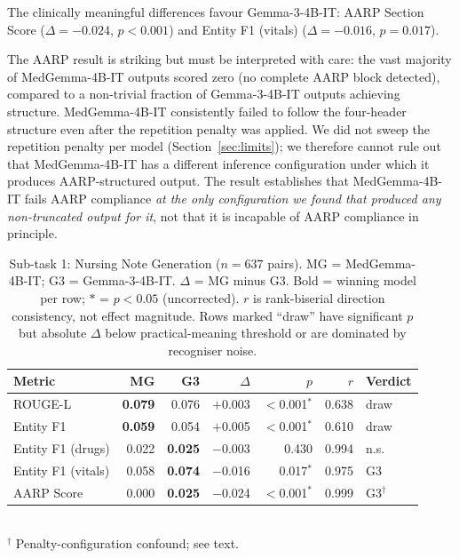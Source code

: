 \documentclass[sigconf,anonymous=false,review=false]{acmart}
\newcommand{\medgemma}{MedGemma-4B-IT\xspace}
\newcommand{\gemma}{Gemma-3-4B-IT\xspace}
\newcommand{\pval}[1]{$p{=}{#1}$}
\newcommand{\sig}{$p{<}0.001$}
\begin{document}
The clinically meaningful differences favour \gemma: AARP Section Score
($\Delta = -0.024$, \sig) and Entity F1 (vitals)
($\Delta = -0.016$, \pval{0.017}).

The AARP result is striking but must be interpreted with care: the vast
majority of \medgemma outputs scored zero (no complete AARP block detected),
compared to a non-trivial fraction of \gemma outputs achieving structure.
\medgemma consistently failed to follow the four-header structure even after
the repetition penalty was applied. We did not sweep the repetition penalty
per model (Section~\ref{sec:limits}); we therefore cannot rule out that
\medgemma has a different inference configuration under which it produces
AARP-structured output. The result establishes that \medgemma fails AARP
compliance \emph{at the only configuration we found that produced any
non-truncated output for it}, not that it is incapable of AARP compliance
in principle.

\begin{table}[t]
\caption{Sub-task 1: Nursing Note Generation ($n = 637$ pairs). MG = MedGemma-4B-IT; G3 = Gemma-3-4B-IT. $\Delta$ = MG minus G3. Bold = winning model per row; $*$ = $p < 0.05$ (uncorrected). $r$ is rank-biserial direction consistency, not effect magnitude. Rows marked ``draw'' have significant $p$ but absolute $\Delta$ below practical-meaning threshold or are dominated by recogniser noise.}
\label{tab:notes}
\small
\begin{tabular}{@{}lrrrrrl@{}}
\toprule
\textbf{Metric} & \textbf{MG} & \textbf{G3} & \textbf{$\Delta$} &
  \textbf{$p$} & \textbf{$r$} & \textbf{Verdict} \\
\midrule
ROUGE-L            & \textbf{0.079} & 0.076 & $+$0.003 & $<$0.001$^*$ & 0.638 & draw \\
Entity F1          & \textbf{0.059} & 0.054 & $+$0.005 & $<$0.001$^*$ & 0.610 & draw \\
Entity F1 (drugs)  & 0.022 & \textbf{0.025} & $-$0.003 & 0.430 & 0.994 & n.s. \\
Entity F1 (vitals) & 0.058 & \textbf{0.074} & $-$0.016 & 0.017$^*$ & 0.975 & G3 \\
AARP Score         & 0.000 & \textbf{0.025} & $-$0.024 & $<$0.001$^*$ & 0.999 & G3$^\dagger$ \\
\bottomrule
\end{tabular}
\\[2pt]
{\footnotesize $^\dagger$ Penalty-configuration confound; see text.}
\end{table}
\end{document}
